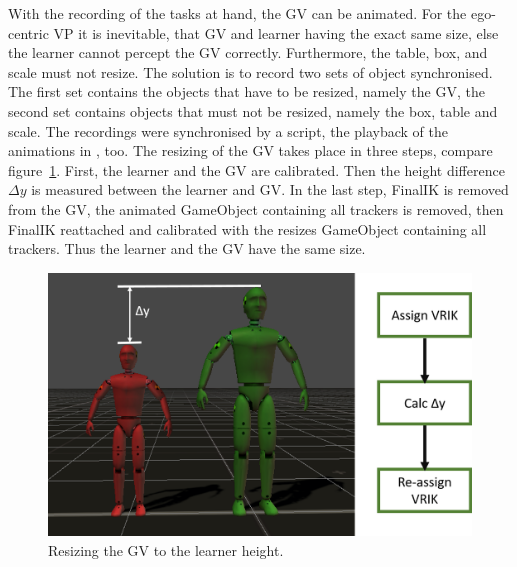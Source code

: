 With the recording of the tasks at hand, the GV can be animated. For the ego-centric VP it is inevitable, that GV and learner having the exact same size, else the learner cannot percept the GV correctly. Furthermore, the table, box, and scale must not resize. The solution is to record two sets of object synchronised. The first set contains the objects that have to be resized, namely the GV, the second set contains objects that must not be resized, namely the box, table and scale. The recordings were synchronised by a script, the playback of the animations in \exgo, too. The resizing of the GV takes place in three steps, compare figure~\ref{fig:resize}. First, the learner and the GV are calibrated. Then the height difference $\Delta y$ is measured between the learner and GV. In the last step, FinalIK is removed from the GV, the animated GameObject containing all trackers is removed, then FinalIK reattached and calibrated with the resizes GameObject containing all trackers. Thus the learner and the GV have the same size.
\begin{figure}[htb]
	\centering
	\includegraphics[width=\textwidth]{figures/resize.png}
	\caption[Resizing the GV to the learner height.]{Resizing the GV to the learner height.}
	\label{fig:resize}
\end{figure}

